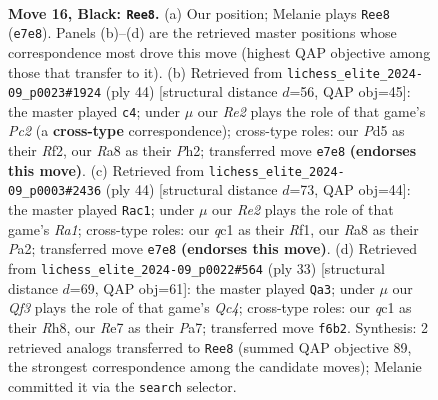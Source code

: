 \documentclass[11pt]{article}
\begin{document}
\begin{figure}[p]\centering
\begin{subfigure}{0.46\textwidth}\centering
\resizebox{\linewidth}{!}{%
\newchessgame
\chessboard[
  setfen={r5k1/pp2r1pp/2nbpq2/3p4/8/N2B4/PPP2PPP/R1Q1R1K1 b - - 1 16},
  showmover=false,
  pgfstyle=straightmove, color=movearrow, markmove={e7-e8}
]}
\caption{}
\end{subfigure}\hfill
\begin{subfigure}{0.46\textwidth}\centering
\resizebox{\linewidth}{!}{%
\newchessgame
\chessboard[
  setfen={2q1r3/p4rkp/b1p3p1/2BnPp2/3N1P2/1P6/2P2RPP/3RQ1K1 w - - 2 23},
  showmover=false,
  pgfstyle=straightmove, color=movearrow, markmove={c2-c4}
]}
\caption{}
\end{subfigure}
\\[4pt]
\begin{subfigure}{0.46\textwidth}\centering
\resizebox{\linewidth}{!}{%
\newchessgame
\chessboard[
  setfen={r3r1k1/p4qpp/2pb4/3pnP2/N7/1P5Q/PB4PP/R4R1K w - - 5 23},
  showmover=false,
  pgfstyle=straightmove, color=movearrow, markmove={a1-c1}
]}
\caption{}
\end{subfigure}\hfill
\begin{subfigure}{0.46\textwidth}\centering
\resizebox{\linewidth}{!}{%
\newchessgame
\chessboard[
  setfen={r6r/pp3pkp/2n1bp2/2q1p3/7Q/2P3P1/P2NPPBP/2R1K2R b K - 6 17},
  showmover=false,
  pgfstyle=straightmove, color=movearrow, markmove={c5-a3}
]}
\caption{}
\end{subfigure}
\caption{\textbf{Move 16, Black: \texttt{Ree8}.} (a) Our position; Melanie plays \texttt{Ree8} (\texttt{e7e8}). Panels (b)--(d) are the retrieved master positions whose correspondence most drove this move (highest QAP objective among those that transfer to it). (b) Retrieved from \texttt{lichess\_elite\_2024-09\_p0023\#1924} (ply 44) [structural distance $d$=56, QAP obj=45]: the master played \texttt{c4}; under $\mu$ our \emph{Re2} plays the role of that game's \emph{Pc2} (a \textbf{cross-type} correspondence); cross-type roles: our \emph{P}d5 as their \emph{R}f2, our \emph{R}a8 as their \emph{P}h2; transferred move \texttt{e7e8} \textbf{(endorses this move)}. (c) Retrieved from \texttt{lichess\_elite\_2024-09\_p0003\#2436} (ply 44) [structural distance $d$=73, QAP obj=44]: the master played \texttt{Rac1}; under $\mu$ our \emph{Re2} plays the role of that game's \emph{Ra1}; cross-type roles: our \emph{q}c1 as their \emph{R}f1, our \emph{R}a8 as their \emph{P}a2; transferred move \texttt{e7e8} \textbf{(endorses this move)}. (d) Retrieved from \texttt{lichess\_elite\_2024-09\_p0022\#564} (ply 33) [structural distance $d$=69, QAP obj=61]: the master played \texttt{Qa3}; under $\mu$ our \emph{Qf3} plays the role of that game's \emph{Qc4}; cross-type roles: our \emph{q}c1 as their \emph{R}h8, our \emph{R}e7 as their \emph{P}a7; transferred move \texttt{f6b2}. Synthesis: 2 retrieved analogs transferred to \texttt{Ree8} (summed QAP objective 89, the strongest correspondence among the candidate moves); Melanie committed it via the \texttt{search} selector.}
\label{fig:thought-m31}
\end{figure}
\end{document}
